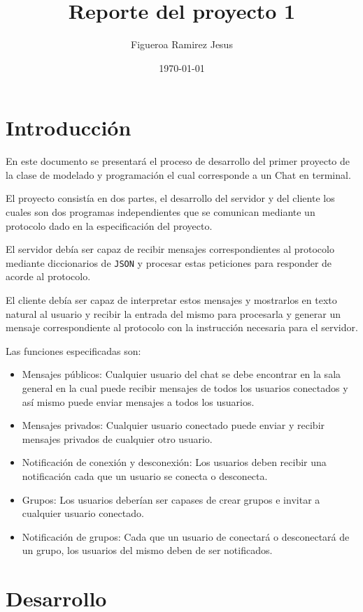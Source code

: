 \documentclass[12pt, titlepage]{article}
\title{Reporte del proyecto 1}
\author{Figueroa Ramirez Jesus}
\date{\today}
\begin{document}
\maketitle

\newpage

\section{Introducción}
En este documento se presentará el proceso de desarrollo del primer proyecto de la clase de modelado y programación el cual corresponde a un Chat en terminal.

El proyecto consistía en dos partes, el desarrollo del servidor y del cliente los cuales son dos programas independientes que se comunican mediante un protocolo dado en la especificación del proyecto.

El servidor debía ser capaz de recibir mensajes correspondientes al protocolo mediante diccionarios de \lstinline|JSON| y procesar estas peticiones para responder de acorde al protocolo.

El cliente debía ser capaz de interpretar estos mensajes y mostrarlos en texto natural al usuario y recibir la entrada del mismo para procesarla y generar un mensaje correspondiente al protocolo con la instrucción necesaria para el servidor.

Las funciones especificadas son:
\begin{itemize}
	\item Mensajes públicos: Cualquier usuario del chat se debe encontrar en la sala general en la cual puede recibir mensajes de todos los usuarios conectados y así mismo puede enviar mensajes a todos los usuarios.
	\item Mensajes privados: Cualquier usuario conectado puede enviar y recibir mensajes privados de cualquier otro usuario.
	\item Notificación de conexión y desconexión: Los usuarios deben recibir una notificación cada que un usuario se conecta o desconecta.
	\item Grupos: Los usuarios deberían ser capases de crear grupos e invitar a cualquier usuario conectado.
	\item Notificación de grupos: Cada que un usuario de conectará o desconectará de un grupo, los usuarios del mismo deben de ser notificados.
\end{itemize}

\section{Desarrollo}
\end{document}
